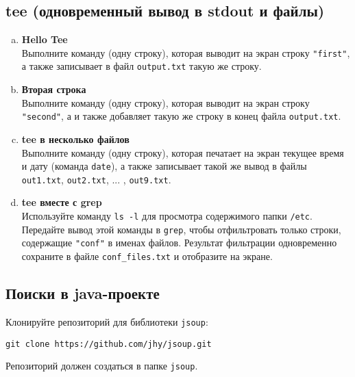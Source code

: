 \documentclass{article}
\begin{document}
\subsection{tee (одновременный вывод в stdout и файлы)}
\begin{enumerate}[a.]
\item \textbf{Hello Tee}\\
Выполните команду (одну строку), которая выводит на экран строку \texttt{"first"}, а также записывает в файл \texttt{output.txt} такую же строку.

\item \textbf{Вторая строка}\\
Выполните команду (одну строку), которая выводит на экран строку \texttt{"second"}, а и также добавляет такую же строку в конец файла \texttt{output.txt}.

\item \textbf{tee в несколько файлов}\\
Выполните команду (одну строку), которая печатает на экран текущее время и дату (команда \texttt{date}), а также записывает такой же вывод в файлы \texttt{out1.txt}, \texttt{out2.txt}, ... , \texttt{out9.txt}.

\item \textbf{tee вместе с grep}\\
Используйте команду \texttt{ls -l} для просмотра содержимого папки \texttt{/etc}. Передайте вывод этой команды в \texttt{grep}, чтобы отфильтровать только строки, содержащие \texttt{"conf"} в именах файлов. Результат фильтрации одновременно сохраните в файле \texttt{conf\_files.txt} и отобразите на экране.
\end{enumerate}

\subsection{Поиски в java-проекте}
Клонируйте репозиторий для библиотеки \texttt{jsoup}:
\begin{lstlisting}
git clone https://github.com/jhy/jsoup.git
\end{lstlisting}
Репозиторий должен создаться в папке \texttt{jsoup}.
\end{document}
